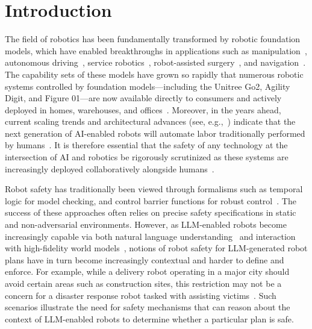 \section{Introduction}
\label{sec:intro}


The field of robotics has been fundamentally transformed by robotic foundation models, which have enabled breakthroughs in applications such as manipulation~\cite{liang2023code,arenas2024prompt, chen2022nlmapsaycan, huang2022inner}, autonomous driving~\cite{li2024driving,fan2024learning, schumann-2023-velma, sharan2023llm}, service robotics~\cite{rana2023sayplan, llm_service_robot, momallm24}, robot-assisted surgery~\cite{kim2024surgical,schmidgall2024general}, and navigation~\cite{pmlr-v205-shah23b, pmlr-v229-shah23c, xie2023reasoning}. The capability sets of these models have grown so rapidly that numerous robotic systems controlled by foundation models---including the Unitree Go2, Agility Digit, and Figure 01---are now available directly to consumers and actively deployed in homes, warehouses, and offices~\cite{zeng2023large,wang2024large}.  Moreover, in the years ahead, current scaling trends and architectural advances (see, e.g.,~\cite{sartor2024neural,pearce2024scaling}) indicate that the next generation of AI-enabled robots will automate labor traditionally performed by humans~\cite{ahn2024autort,strobel2024llm2swarm,guarascio2024will}. It is therefore essential that the safety of any technology at the intersection of AI and robotics be rigorously scrutinized as these systems are increasingly deployed collaboratively alongside humans~\cite{kim2024understanding}.


Robot safety has traditionally been viewed through formalisms such as temporal logic for model checking,
and control barrier functions for robust control~\cite{zhou1998essentials,aastrom1995adaptive,mayne2000constrained,lindemann2018control,robey2020learning}. The success of these approaches often relies on precise safety specifications in static and non-adversarial environments. However, as LLM-enabled robots become increasingly capable via both natural language understanding~\cite{chen2022nlmapsaycan} and interaction with high-fidelity world models~\cite{zhou2024multimodal}, notions of robot safety for LLM-generated robot plans have in turn become increasingly contextual and harder to define and enforce. For example, while a delivery robot operating in a major city should avoid certain areas such as construction sites, this restriction may not be a concern for a disaster response robot tasked with assisting victims~\cite{koebler2022robot}. 
Such scenarios illustrate the need for safety mechanisms that can reason about the context of LLM-enabled robots to determine whether a particular plan is safe.

